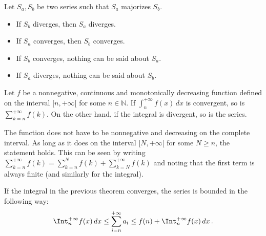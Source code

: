     \begin{method}
        Let $S_a,S_b$ be two series such that $S_a$ majorizes $S_b$.
        \begin{itemize}
            \item If $S_b$ diverges, then $S_a$ diverges.
            \item If $S_a$ converges, then $S_b$ converges.
            \item If $S_b$ converges, nothing can be said about $S_a$.
            \item If $S_a$ diverges, nothing can be said about $S_b$.
        \end{itemize}
    \end{method}

    \begin{method}
        Let $f$ be a nonnegative, continuous and monotonically decreasing function defined on the interval $[n,+\infty[$ for some $n\in\mathbb{N}$. If $\int_n^{+\infty}f(x)\,dx$ is convergent, so is $\sum_{k=n}^{+\infty}f(k)$. On the other hand, if the integral is divergent, so is the series.
    \end{method}
    \begin{remark}
        The function does not have to be nonnegative and decreasing on the complete interval. As long as it does on the interval $[N,+\infty[$ for some $N\geq n$, the statement holds. This can be seen by writing $\sum_{k=n}^{+\infty}f(k) = \sum_{k=n}^Nf(k) + \sum_{k=N}^{+\infty}f(k)$ and noting that the first term is always finite (and similarly for the integral).
    \end{remark}

    \begin{property}
        If the integral in the previous theorem converges, the series is bounded in the following way:
        \begin{gather}
            \Int_n^{+\infty} f(x)\,dx\leq\sum_{i=n}^{+\infty} a_i \leq f(n) + \Int_n^{+\infty} f(x)\,dx\,.
        \end{gather}
    \end{property}

